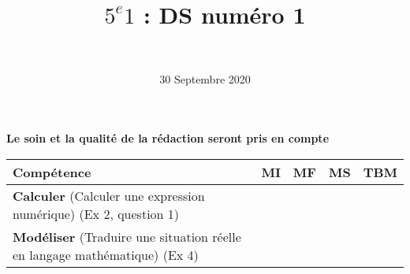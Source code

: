 \documentclass[a4paper,12pt]{exam}
\author{\ }
\date{30 Septembre 2020}
\title{$5^e 1$ : DS num\'ero 1}
\begin{document}
%	

	\maketitle
	
\begin{center}
	\textbf{Le soin et la qualité de la rédaction seront pris en compte}
\end{center}

\begin{small}
	\begin{center}
		\begin{tabular}{|@{\ }l@{\ }|@{\ }c@{\ }|@{\ }c@{\ }|@{\ }c@{\ }|@{\ }c@{\ }|}
			\hline
			\textbf{Compétence} & \textbf{MI} & \textbf{MF} & \textbf{MS} & \textbf{TBM} \\
			\hline
			\textbf{Calculer} (Calculer une expression numérique) (Ex 2, question 1)&  \ \ & \ \ & \ \ & \ \  \\
			\hline	
			\textbf{Modéliser} (Traduire une situation réelle en langage mathématique) (Ex 4)& \ \ & \ \ &  \ \  & \ \ \\
			\hline
		\end{tabular}
	\end{center}
\end{small}	

	
	
	



%

%



\newpage



\label{LastPage}

%
\end{document}
